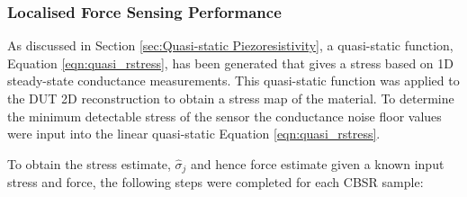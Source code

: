 \subsubsection{Localised Force Sensing Performance}\label{sec:Localised Force Sensing Performance}
As discussed in Section \ref{sec:Quasi-static Piezoresistivity}, a quasi-static function, Equation \ref{eqn:quasi_rstress}, has been generated that gives a stress based on 1D steady-state conductance measurements. This quasi-static function was applied to the DUT 2D reconstruction to obtain a stress map of the material. To determine the minimum detectable stress of the sensor the conductance noise floor values were input into the linear quasi-static Equation \ref{eqn:quasi_rstress}.

To obtain the stress estimate, $\hat\sigma_j$ and hence force estimate given a known input stress and force, the following steps were completed for each CBSR sample:
